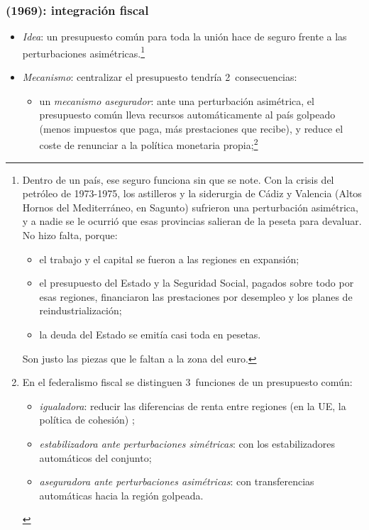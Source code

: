 \documentclass[11pt]{article}
\begin{document}
\subsubsection{ (1969): integración fiscal}\label{sec:kenen-fiscal}

\begin{itemize}
\item \emph{Idea}: un presupuesto común para toda la unión hace de seguro frente a las perturbaciones asimétricas\nocite{Kenen1969Theory}.\footnote{Dentro de un país, ese seguro funciona sin que se note. Con la crisis del petróleo de 1973-1975, los astilleros y la siderurgia de Cádiz y Valencia (Altos Hornos del Mediterráneo, en Sagunto) sufrieron una perturbación asimétrica, y a nadie se le ocurrió que esas provincias salieran de la peseta para devaluar. No hizo falta, porque:
\begin{itemize}
\item el trabajo y el capital se fueron a las regiones en expansión;
\item el presupuesto del Estado y la Seguridad Social, pagados sobre todo por esas regiones, financiaron las prestaciones por desempleo y los planes de reindustrialización;
\item la deuda del Estado se emitía casi toda en pesetas.
\end{itemize}
Son justo las piezas que le faltan a la zona del euro\nocite{SanchisiMarco2014Economics}.}
\item \emph{Mecanismo}: centralizar el presupuesto tendría 2~consecuencias:
  \begin{itemize}
  \item un \emph{mecanismo asegurador}: ante una perturbación asimétrica, el presupuesto común lleva recursos automáticamente al país golpeado (menos impuestos que paga, más prestaciones que recibe), y reduce el coste de renunciar a la política monetaria propia;\footnote{En el federalismo fiscal se distinguen 3~funciones de un presupuesto común:
\begin{itemize}
\item \emph{igualadora}: reducir las diferencias de renta entre regiones (en la UE, la política de cohesión) ;
\item \emph{estabilizadora ante perturbaciones simétricas}: con los estabilizadores automáticos del conjunto;
\item \emph{aseguradora ante perturbaciones asimétricas}: con transferencias automáticas hacia la región golpeada.

\end{itemize}}
\end{itemize}
\end{itemize}
\end{document}
